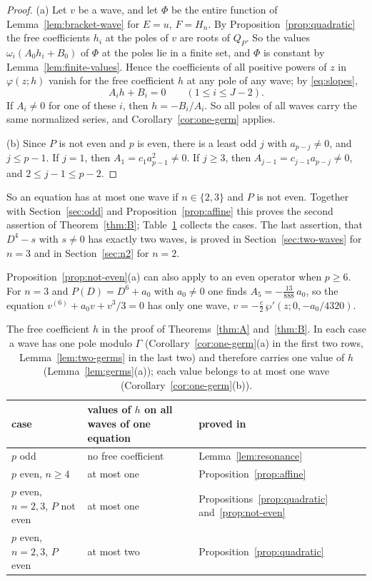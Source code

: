 \documentclass[11pt]{article}
\theoremstyle{definition}
\theoremstyle{remark}
\numberwithin{equation}{section}
\begin{document}
\begin{proof}
(a) Let \(v\) be a wave, and let \(\Phi\) be the entire function of
Lemma~\ref{lem:bracket-wave} for \(E=u\), \(F=H_n\). By
Proposition~\ref{prop:quadratic} the free coefficients \(h_i\) at the
poles of \(v\) are roots of \(Q_P\). So the values
\(\omega_i(A_0h_i+B_0)\) of \(\Phi\) at the poles lie in a finite set,
and \(\Phi\) is constant by Lemma~\ref{lem:finite-values}. Hence the
coefficients of all positive powers of \(z\) in \(\varphi(z;h)\) vanish
for the free coefficient \(h\) at any pole of any wave; by
\eqref{eq:slopes},
\[
 A_ih+B_i=0\qquad(1\le i\le J-2).
\]
If \(A_i\ne0\) for one of these \(i\), then \(h=-B_i/A_i\). So all
poles of all waves carry the same normalized series, and
Corollary~\ref{cor:one-germ} applies.

(b) Since \(P\) is not even and \(p\) is even, there is a least odd
\(j\) with \(a_{p-j}\ne0\), and \(j\le p-1\). If \(j=1\), then
\(A_1=c_1a_{p-1}^2\ne0\). If \(j\ge3\), then
\(A_{j-1}=c_{j-1}a_{p-j}\ne0\), and \(2\le j-1\le p-2\).
\end{proof}

So an equation has at most one wave if \(n\in\{2,3\}\) and \(P\) is not
even. Together with Section~\ref{sec:odd} and
Proposition~\ref{prop:affine} this proves the second assertion of
Theorem~\ref{thm:B}; Table~\ref{tab:cases} collects the cases. The last
assertion, that \(D^4-s\) with \(s\ne0\) has exactly two waves, is
proved in
Section~\ref{sec:two-waves} for \(n=3\) and in Section~\ref{sec:n2} for
\(n=2\).

Proposition~\ref{prop:not-even}(a) can also apply to an even operator
when \(p\ge6\). For
\(n=3\) and \(P(D)=D^6+a_0\) with \(a_0\ne0\) one finds
\(A_5=-\tfrac{13}{888}\,a_0\), so the equation
\(v^{(6)}+a_0v+v^3/3=0\) has only one wave,
\(v=-\tfrac c2\,\wp'(z;0,-a_0/4320)\).

\begin{table}[ht]
\centering
\small
\begin{tabular}{@{}lll@{}}
\toprule
case & values of \(h\) on all waves of one equation & proved in\\
\midrule
\(p\) odd & no free coefficient & Lemma~\ref{lem:resonance}\\
\(p\) even, \(n\ge4\) & at most one & Proposition~\ref{prop:affine}\\
\(p\) even, \(n=2,3\), \(P\) not even & at most one &
 Propositions~\ref{prop:quadratic} and~\ref{prop:not-even}\\
\(p\) even, \(n=2,3\), \(P\) even & at most two &
 Proposition~\ref{prop:quadratic}\\
\bottomrule
\end{tabular}
\caption{The free coefficient \(h\) in the proof of
Theorems~\ref{thm:A} and~\ref{thm:B}. In each case a wave has one pole
modulo \(\Gamma\) (Corollary~\ref{cor:one-germ}(a) in the first two
rows, Lemma~\ref{lem:two-germs} in the last two) and therefore carries one
value of \(h\) (Lemma~\ref{lem:germs}(a)); each value belongs to at
most one wave
(Corollary~\ref{cor:one-germ}(b)).}
\label{tab:cases}
\end{table}
\end{document}
